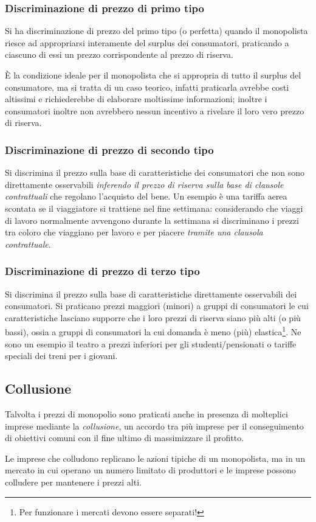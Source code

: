 \subsubsection{Discriminazione di prezzo di primo tipo}
Si ha discriminazione di prezzo del primo tipo (o perfetta) quando il monopolista riesce ad
appropriarsi interamente del surplus dei consumatori, praticando a ciascuno di essi un prezzo
corrispondente al prezzo di riserva.

È la condizione ideale per il monopolista che si appropria di tutto il surplus del consumatore, ma si
tratta di un caso teorico, infatti praticarla avrebbe costi altissimi e richiederebbe di elaborare moltissime informazioni; inoltre i consumatori inoltre non avrebbero nessun incentivo a rivelare il loro vero prezzo di riserva.

\subsubsection{Discriminazione di prezzo di secondo tipo}
Si discrimina il prezzo sulla base di caratteristiche dei consumatori che non sono direttamente
osservabili \emph{inferendo il prezzo di riserva sulla base di clausole contrattuali} che regolano l’acquisto del bene.
Un esempio è una tariffa aerea scontata se il viaggiatore si trattiene nel fine settimana: considerando che viaggi di lavoro normalmente avvengono durante la settimana si discriminano i prezzi tra coloro che viaggiano per lavoro e per piacere \emph{tramite una clausola contrattuale}.

\subsubsection{Discriminazione di prezzo di terzo tipo}
Si discrimina il prezzo sulla base di caratteristiche direttamente osservabili dei consumatori.
Si praticano prezzi maggiori (minori) a gruppi di consumatori le cui caratteristiche lasciano supporre
che i loro prezzi di riserva siano più alti (o più bassi), ossia a gruppi di consumatori la cui domanda è meno (più) elastica\footnote{Per funzionare i mercati devono essere separati!}.
Ne sono un esempio il teatro a prezzi inferiori per gli studenti/pensionati
o tariffe speciali dei treni per i giovani.

\subsection{Collusione}

Talvolta i prezzi di monopolio sono praticati anche in presenza di molteplici imprese
mediante la \emph{collusione}, un accordo tra più imprese per il conseguimento di obiettivi comuni con il fine ultimo di
massimizzare il profitto.

Le imprese che colludono replicano le azioni tipiche di un monopolista, ma in un mercato in cui
operano un numero limitato di produttori e le imprese possono colludere per mantenere i prezzi
alti.